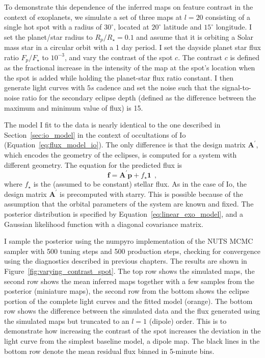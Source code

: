 \documentclass[12pt,dvipsnames]{report}
\newcommand{\ssf}[1]{\textsf{#1}}
\renewcommand{\vec}[1]{\boldsymbol{\mathbf{#1}}}
\newcommand{\hquad}{~~}
\begin{document}
To demonstrate this dependence of the inferred maps on feature contrast in the context of 
exoplanets, we simulate a set of three maps at $l=20$ consisting
of a single hot spot  with a radius of $30^\circ$, 
located at $20^\circ$ latitude and $15^\circ$ longitude.
I set the planet/star radius to $R_p/R_\star=0.1$ and assume that it is orbiting a 
Solar mass star in a circular orbit with a 1 day period. 
I set the dayside planet star flux ratio 
$F_p/F_\star$ to $10^{-3}$, and vary the contrast of the spot $c$.
The contrast $c$ is defined 
as the fractional increase in the intensity of 
the map at the spot's location when the spot is added while holding the 
planet-star flux ratio constant. I then generate light curves with $5s$
cadence and set the noise such that the signal-to-noise ratio for the secondary
eclipse depth (defined as the difference between the maximum and minimum value of flux) is 15.

The model I fit to the data is nearly identical to the one described in 
Section~\ref{sec:io_model} in the context of occultations of Io 
(Equation~\ref{eq:flux_model_io}). The only difference is that the design matrix $\vec A^\prime$,
which encodes the geometry of the eclipses, is computed for a system with different 
geometry.
The equation for the predicted flux is 
\begin{equation}
    \vec{f} = \vec{A}^\prime\vec{p} + f_\star\vec{1}
    \hquad,
    \label{eq:linear_exo_model}
\end{equation}
where $f_\star$ is the (assumed to be constant) stellar flux.
As in the case of Io, the design matrix $\vec{A}^\prime$ is precomputed with \ssf{starry}.
This is possible because of the assumption that the orbital parameters of the system are 
known and fixed. 
The posterior distribution is specified by Equation~\ref{eq:linear_exo_model}, and 
a Gaussian likelihood function with a diagonal covariance matrix. 

I sample the posterior using the \ssf{numpyro} implementation of the NUTS MCMC sampler 
with 500 tuning steps and 500 production 
steps, checking for convergence using the diagnostics described in previous chapters. 
The results are shown in Figure~\ref{fig:varying_contrast_spot}. The top row
shows the simulated maps, the second row shows the mean inferred maps together
with a few samples from the posterior (miniature maps),  the second row from the
bottom shows the eclipse portion of the complete light curves and the fitted
model (orange). The bottom row shows the difference between the
simulated data and the flux generated using the simulated maps but truncated to an 
$l=1$ (dipole) order. This is to demonstrate how increasing the contrast of the spot 
increases the deviation in the light curve from the simplest baseline model, a dipole map. 
The black lines in the bottom row denote the mean residual flux binned in 5-minute bins.
\end{document}
